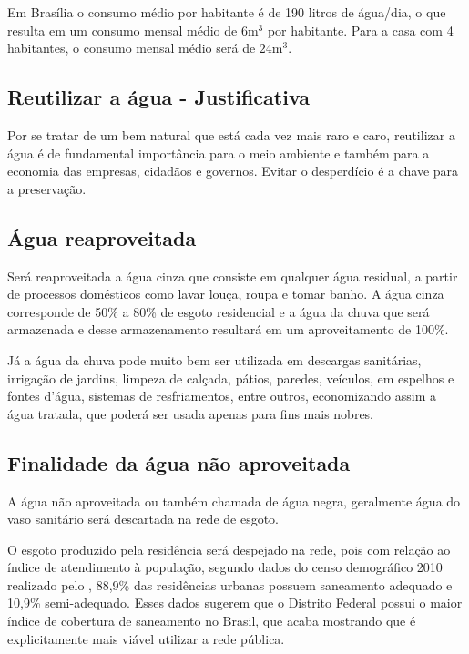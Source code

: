 	Em Brasília o consumo médio por habitante é de 190 litros de água/dia, o que resulta em um consumo mensal médio de $6\si{\meter}^3$ por habitante. Para a casa com 4 habitantes, o consumo mensal médio será de $24\si{\meter}^3$.

\subsection{Reutilizar a água - Justificativa}

	Por se tratar de um bem natural que está cada vez mais raro e caro, reutilizar a água é de fundamental importância para o meio ambiente e também para a economia das empresas, cidadãos e governos. Evitar o desperdício é a chave para a preservação.

\subsection{Água reaproveitada}

	Será reaproveitada a água cinza que consiste em qualquer água residual, a partir de processos domésticos como lavar louça, roupa e tomar banho. A água cinza corresponde de 50\% a 80\% de esgoto residencial e a água da chuva que será armazenada e desse armazenamento resultará em um aproveitamento de 100\%.

	Já a água da chuva pode muito bem ser utilizada em descargas sanitárias, irrigação de jardins, limpeza de calçada, pátios, paredes, veículos, em espelhos e fontes d’água, sistemas de resfriamentos, entre outros, economizando assim a água tratada, que poderá ser usada apenas para fins mais nobres.

\subsection{Finalidade da água não aproveitada}

	A água não aproveitada ou também chamada de água negra, geralmente água do vaso sanitário será descartada na rede de esgoto.

	O esgoto produzido pela residência será despejado na rede, pois com relação ao índice de atendimento à população, segundo dados do censo demográfico 2010 realizado pelo \cite{IBGE}, 88,9\% das residências urbanas possuem saneamento adequado e 10,9\% semi-adequado. Esses dados sugerem que o Distrito Federal possui o maior índice de cobertura de saneamento no Brasil, que acaba mostrando que é explicitamente mais viável utilizar a rede pública.

